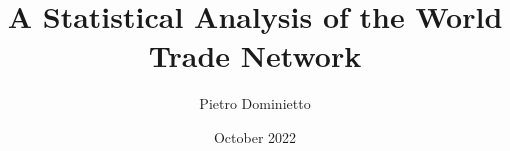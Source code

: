 \documentclass[a4paper,12pt]{report}
\title{A Statistical Analysis of the World Trade Network}
\author{Pietro Dominietto}
\date{October 2022}
\begin{document}
\maketitle


\begin{singlespace}

\tableofcontents

\listoftables
\listoffigures
\end{singlespace}
\pagebreak







\begin{singlespace}
% 
\printbibliography

\appendix

\end{singlespace}
\end{document}
